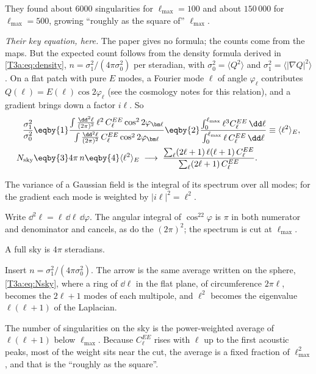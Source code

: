 They found about $6000$ singularities for $\ell_{\max}=100$ and about $150\,000$ for $\ell_{\max}=500$, growing
``roughly as the square of'' $\ell_{\max}$.

\emph{Their key equation, here.} The paper gives no formula; the counts come from the maps. But the expected count
follows from the density formula derived in \cref{T3a:eq:density}, $n=\sigma_1^2/(4\pi\sigma_0^2)$ per steradian, with
$\sigma_0^2=\langle Q^2\rangle$ and $\sigma_1^2=\langle|\nabla Q|^2\rangle$. On a flat patch with pure $E$ modes, a Fourier
mode $\bm\ell$ of angle $\varphi_{\bm\ell}$ contributes $Q(\bm\ell)=E(\bm\ell)\cos2\varphi_{\bm\ell}$ (see the cosmology
notes for this relation), and a gradient brings down a factor $i\bm\ell$. So
\begin{align}
  \frac{\sigma_1^2}{\sigma_0^2}
  &\eqby{1}\frac{\int\frac{\dd^2\ell}{(2\pi)^2}\,\ell^2\,C_\ell^{EE}\cos^22\varphi_{\bm\ell}}
                {\int\frac{\dd^2\ell}{(2\pi)^2}\,C_\ell^{EE}\cos^22\varphi_{\bm\ell}}
   \eqby{2}\frac{\int_0^{\ell_{\max}}\ell^3C_\ell^{EE}\,\dd\ell}{\int_0^{\ell_{\max}}\ell\,C_\ell^{EE}\,\dd\ell}
   \equiv\langle\ell^2\rangle_E ,\nonumber\\
  N_{\rm sky}
  &\eqby{3}4\pi\,n\eqby{4}\langle\ell^2\rangle_E
   \;\longrightarrow\;\frac{\sum_{\ell}(2\ell+1)\,\ell(\ell+1)\,C_\ell^{EE}}{\sum_{\ell}(2\ell+1)\,C_\ell^{EE}} .
  \label{12b:eq:nsky}
\end{align}
\begin{explain}
  \item The variance of a Gaussian field is the integral of its spectrum over all modes; for the gradient each mode is
        weighted by $|i\bm\ell|^2=\ell^2$.
  \item Write $\dd^2\ell=\ell\,\dd\ell\,\dd\varphi$. The angular integral of $\cos^22\varphi$ is $\pi$ in both numerator
        and denominator and cancels, as do the $(2\pi)^2$; the spectrum is cut at $\ell_{\max}$.
  \item A full sky is $4\pi$ steradians.
  \item Insert $n=\sigma_1^2/(4\pi\sigma_0^2)$. The arrow is the same average written on the sphere, \cref{T3a:eq:Nsky},
        where a ring of $\dd\ell$ in the flat plane, of circumference $2\pi\ell$, becomes the $2\ell+1$ modes of each
        multipole, and $\ell^2$ becomes the eigenvalue $\ell(\ell+1)$ of the Laplacian.
\end{explain}
The number of singularities on the sky is the power-weighted average of $\ell(\ell+1)$ below $\ell_{\max}$. Because
$C_\ell^{EE}$ rises with $\ell$ up to the first acoustic peaks, most of the weight sits near the cut, the average is a
fixed fraction of $\ell_{\max}^2$, and that is the ``roughly as the square''.

